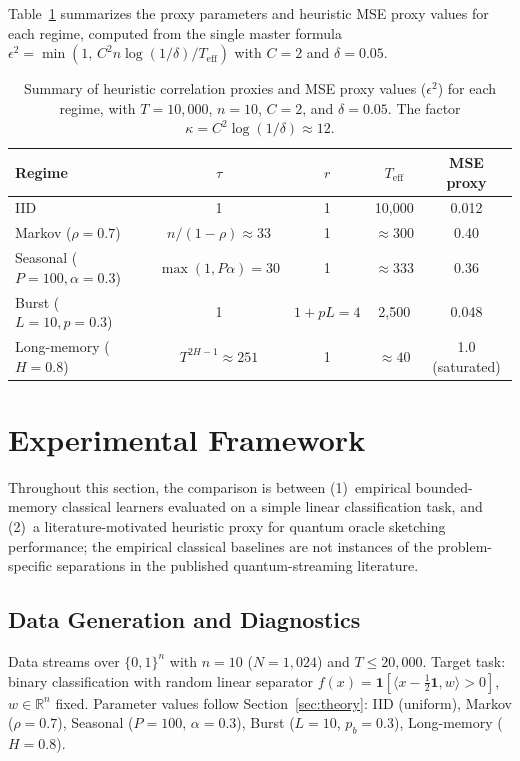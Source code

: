 \documentclass[sensors,article,submit,pdftex,moreauthors]{Definitions/mdpi}
\newcommand{\R}{\mathbb{R}}
\newcommand{\Teff}{T_{\mathrm{eff}}}
\begin{document}
Table~\ref{tab:bounds} summarizes the proxy parameters and heuristic MSE proxy values for each regime, computed from the single master formula $\epsilon^2 = \min(1,\, C^2 n \log(1/\delta) / \Teff)$ with $C = 2$ and $\delta = 0.05$.

\begin{table}[t]
\centering
\caption{Summary of heuristic correlation proxies and MSE proxy values ($\epsilon^2$) for each regime, with $T = 10{,}000$, $n = 10$, $C = 2$, and $\delta = 0.05$. The factor $\kappa = C^2 \log(1/\delta) \approx 12$.}
\label{tab:bounds}
\begin{tabular}{@{}lcccc@{}}
\toprule
Regime & $\tau$ & $r$ & $\Teff$ & MSE proxy \\
\midrule
IID & 1 & 1 & 10{,}000 & 0.012 \\
Markov ($\rho{=}0.7$) & $n/(1{-}\rho) \approx 33$ & 1 & $\approx 300$ & 0.40 \\
Seasonal ($P{=}100, \alpha{=}0.3$) & $\max(1, P\alpha) = 30$ & 1 & $\approx 333$ & 0.36 \\
Burst ($L{=}10, p{=}0.3$) & 1 & $1{+}pL = 4$ & 2{,}500 & 0.048 \\
Long-memory ($H{=}0.8$) & $T^{2H{-}1} \approx 251$ & 1 & $\approx 40$ & 1.0 (saturated) \\
\bottomrule
\end{tabular}

\end{table}


\section{Experimental Framework}
\label{sec:experiments}

Throughout this section, the comparison is between (1)~empirical bounded-memory classical learners evaluated on a simple linear classification task, and (2)~a literature-motivated heuristic proxy for quantum oracle sketching performance; the empirical classical baselines are not instances of the problem-specific separations in the published quantum-streaming literature.

\subsection{Data Generation and Diagnostics}

Data streams over $\{0,1\}^n$ with $n = 10$ ($N = 1{,}024$) and $T \leq 20{,}000$. Target task: binary classification with random linear separator $f(x) = \mathbf{1}[\langle x - \tfrac{1}{2}\mathbf{1}, w \rangle > 0]$, $w \in \R^n$ fixed. Parameter values follow Section~\ref{sec:theory}: IID (uniform), Markov ($\rho = 0.7$), Seasonal ($P = 100$, $\alpha = 0.3$), Burst ($L = 10$, $p_b = 0.3$), Long-memory ($H = 0.8$).
\end{document}
